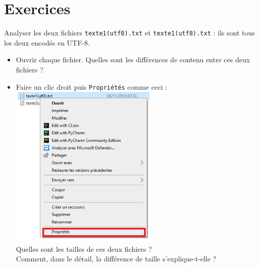 \section{Exercices}
\begin{exercice}
    Analyser les deux fichiers \texttt{texte1(utf8).txt} et \texttt{texte1(utf8).txt} : ils sont tous les deux encodés en UTF-8.


    \begin{itemize}
        \item Ouvrir chaque fichier. Quelles sont les différences de contenu entre ces deux fichiers ?
        \item Faire un clic droit puis \texttt{Propriétés} comme ceci :\\

              \includegraphics[width=7cm]{ch-texte/img/expli1}\\

              Quelles sont les tailles de ces deux fichiers ?\\
              Comment, dans le détail, la différence de taille s'explique-t-elle ?

    \end{itemize}
\end{exercice}

